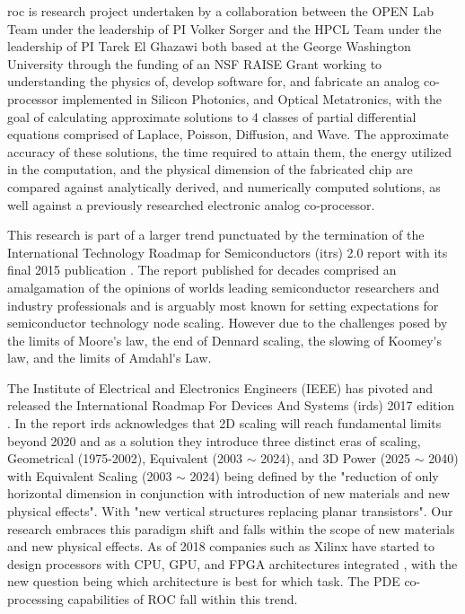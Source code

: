 \acrfull{roc} is research project undertaken by a collaboration between the OPEN Lab Team under the leadership of PI Volker Sorger and the HPCL Team under the leadership of PI Tarek El Ghazawi both based at the George Washington University through the funding of an NSF RAISE Grant working to understanding the physics of, develop software for, and fabricate an analog co-processor implemented in Silicon Photonics, and Optical Metatronics, with the goal of calculating approximate solutions to 4 classes of partial differential equations comprised of Laplace, Poisson, Diffusion, and Wave. The approximate accuracy of these solutions, the time required to attain them, the energy utilized in the computation, and the physical dimension of the fabricated chip are compared against analytically derived, and numerically computed solutions, as well against a previously researched electronic analog co-processor.

\par This research is part of a larger trend punctuated by the termination of the \gls{International Technology Roadmap for Semiconductors} (\acrshort{itrs}) 2.0 report with its final 2015 publication \cite{itrs2.0_2015}. The report published for decades comprised an amalgamation of the opinions of worlds leading semiconductor researchers and industry professionals and is arguably most known for setting expectations for semiconductor \gls{technology node} scaling. However due to the challenges posed by the limits of \gls{Moore's law}, the end of \gls{Dennard scaling}, the slowing of \gls{Koomey's law}, and the limits of \gls{Amdahl's Law}. 

\par The \gls{Institute of Electrical and Electronics Engineers} (\acrshort{IEEE}) has pivoted and released the \gls{International Roadmap For Devices And Systems} (\acrshort{irds}) 2017 edition \cite{irds_2017}. In the report \acrshort{irds} acknowledges that 2D scaling will reach fundamental limits beyond 2020 and as a solution they introduce three distinct eras of scaling, Geometrical (1975-2002), Equivalent (2003 $\sim$ 2024), and 3D Power (2025 $\sim$ 2040) with Equivalent Scaling (2003 $\sim$ 2024) being defined by the "reduction of only horizontal dimension in conjunction with introduction of new materials and new physical effects". With "new vertical structures replacing planar transistors". Our research embraces this paradigm shift and falls within the scope of new materials and new physical effects. As of 2018 companies such as Xilinx have started to design processors with CPU, GPU, and FPGA architectures integrated \cite{vissers2019versal}, with the new question being which architecture is best for which task. The PDE co-processing capabilities of ROC fall within this trend.
